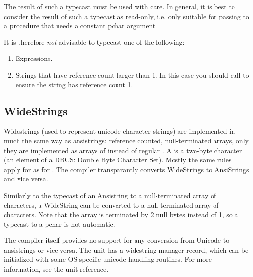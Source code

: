 The result of such a typecast must be used with care. In general, it is best
to consider the result of such a typecast as read-only, i.e. only suitable for
passing to a procedure that needs a constant pchar argument.

It is therefore {\em not} advisable to typecast one of the following:
\begin{enumerate}
\item Expressions.
\item Strings that have reference count larger than 1.
In this case you should call  to ensure the 
string has reference count 1.
\end{enumerate}

\subsection{WideStrings}
Widestrings (used to represent unicode character strings) are implemented in much 
the same way as ansistrings: reference counted, null-terminated arrays, only they 
are implemented as arrays of  instead of regular .
A  is a two-byte character (an element of a DBCS: Double Byte
Character Set). Mostly the same rules apply for  as for 
. The compiler transparantly converts WideStrings to
AnsiStrings and vice versa. 

Similarly to the typecast of an Ansistring to a  null-terminated
%
array of characters, a WideString can be converted to a 
null-terminated array of characters. 
Note that the  array is terminated by 2 null bytes instead of
1, so a typecast to a pchar is not automatic.

The compiler itself provides no support for any conversion from Unicode to
ansistrings or vice versa. The  unit has a widestring manager
record, which can be initialized with some OS-specific unicode handling
routines. For more information, see the  unit reference.


